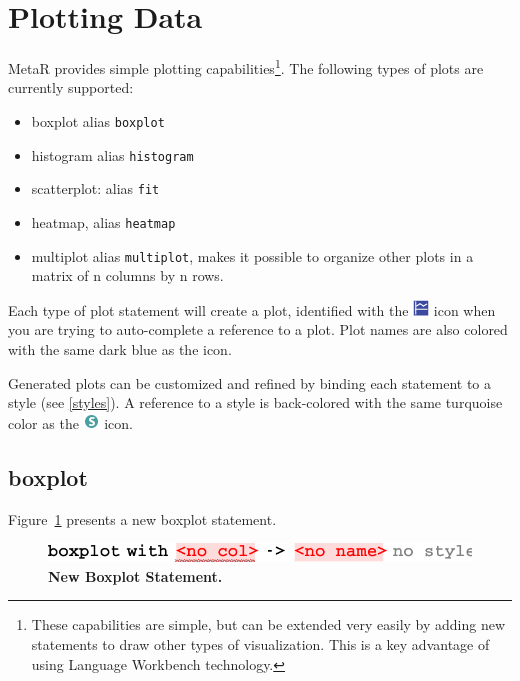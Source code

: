 \section{Plotting Data}
MetaR provides simple plotting capabilities\footnote{These capabilities are simple, but can be extended very easily by adding new statements to draw other types of visualization. This is a key advantage of using Language Workbench technology.}. The following types of plots are currently supported: 
\begin{itemize}
  \item boxplot alias \texttt{boxplot}
  \item histogram alias \texttt{histogram}
  \item scatterplot: alias \texttt{fit}
  \item heatmap, alias \texttt{heatmap}
  \item multiplot alias \texttt{multiplot}, makes it possible to organize other plots in a matrix of n columns by n rows.
\end{itemize}
Each type of plot statement will create a plot, identified with the \includegraphics[height=2ex]{figures/plot.png} icon when you are trying to auto-complete a reference to a plot. Plot names are also colored with the same dark blue as the icon.

Generated plots can be customized and refined by binding each statement to a style (see \ref{styles}). A reference to a style is back-colored with the same turquoise color as the  \includegraphics[height=2ex]{figures/style.png} icon.

\subsection{boxplot}
Figure~\ref{fig:NewBoxPlot} presents a new boxplot statement.

\begin{figure}
  \centering
  \includegraphics[width=\figWidthNarrow]{figures/NewBoxplot.pdf}
\caption[New Boxplot Statement.]{\textbf{New Boxplot Statement.}}
\label{fig:NewBoxPlot}
\end{figure}

